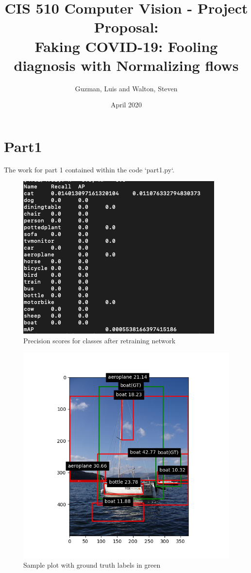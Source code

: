 \documentclass{article}
\title{CIS 510 Computer Vision - Project Proposal:\\
	Faking COVID-19: Fooling diagnosis with Normalizing flows}
\author{Guzman, Luis and Walton, Steven}
\date{April 2020}
\begin{document}
\maketitle

\section{Part1}
The work for part 1 contained within the code `part1.py`. 

\begin{figure}
\centering
\includegraphics[width=\textwidth]{mAP.png}
\caption{Precision scores for classes after retraining network}
\end{figure}

\begin{figure}
\centering
\includegraphics[width=\textwidth]{example.png}
\caption{Sample plot with ground truth labels in green}
\label{fig:boat}
\end{figure}
\end{document}
